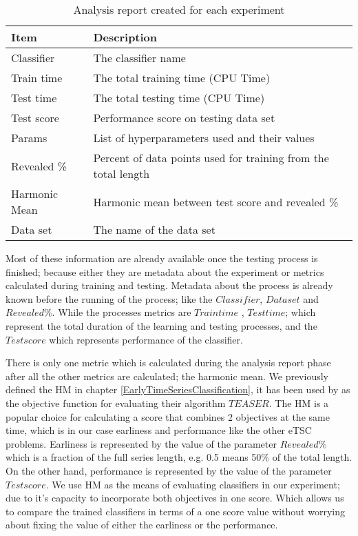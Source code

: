 \begin{table}[hbt!]
  \setlength\extrarowheight{2pt} %
  \begin{tabularx}{\textwidth}{|X|X|}
  \hline
  \textbf{Item} & \textbf{Description} \\ \hline
    Classifier                 & The classifier name                                             \\ \hline
    Train time                 & The total training time (CPU Time)                              \\ \hline
    Test time                  & The total testing time (CPU Time)                               \\ \hline
    Test score                 & Performance score on testing data set                           \\ \hline
    Params                     & List of hyperparameters used and their values                   \\ \hline
    Revealed \%                & Percent of data points used for training from the total length  \\ \hline
    Harmonic Mean              & Harmonic mean between test score and revealed \%                \\ \hline
    Data set                   & The name of the data set                                        \\ \hline
  \end{tabularx}
  \caption{Analysis report created for each experiment}
  \label{TableAnalysisReport}
\end{table}

Most of these information are already available once the testing process is finished; because either they are metadata about the experiment or metrics calculated during training and testing.
Metadata about the process is already known before the running of the process; like the $Classifier$, $Data set$ and $Revealed \%$.
While the processes metrics are $Train time$ , $Test time$; which represent the total duration of the learning and testing processes, and the $Test score$ which represents performance of the classifier.


There is only one metric which is calculated during the analysis report phase after all the other metrics are calculated; the harmonic mean.
We previously defined the HM in chapter \ref{EarlyTimeSeriesClassification}, it has been used by \cite{schafer2020teaser} as the objective function for evaluating their algorithm $TEASER$.
The HM is a popular choice for calculating a score that combines 2 objectives at the same time, which is in our case earliness and performance like the other eTSC problems.
Earliness is represented by the value of the parameter $Revealed \%$ which is a fraction of the full series length, e.g. 0.5 means 50\% of the total length.
On the other hand, performance is represented by the value of the parameter $Test score$.
We use HM as the means of evaluating classifiers in our experiment; due to it's capacity to incorporate both objectives in one score.
Which allows us to compare the trained classifiers in terms of a one score value without worrying about fixing the value of either the earliness or the performance.

